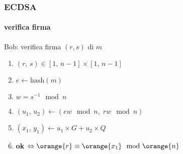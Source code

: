 \begin{frame}
\frametitle{ECDSA}
\framesubtitle{verifica firma}	

	{\color{blue}Bob}: verifica firma $(r,s)$ di $m$
	\begin{enumerate}
	  \item $(r,\,s)\in [1,\,n-1]\times[1,\,n-1]$
	  \item $e \leftarrow \mathrm{hash}(m)$  %
	  \item $w=s^{-1} \mod n$ 
	  \item $(u_1,\,u_2) \leftarrow (ew\mod n,\;rw \mod n)$
	  \item $(x_1,\,y_1) \leftarrow u_1 \times G + u_2 \times Q$
	  \item \textbf{ok} $\Leftrightarrow \orange{r} \equiv \orange{x_1} \mod \orange{n}$
	\end{enumerate}
\end{frame}
